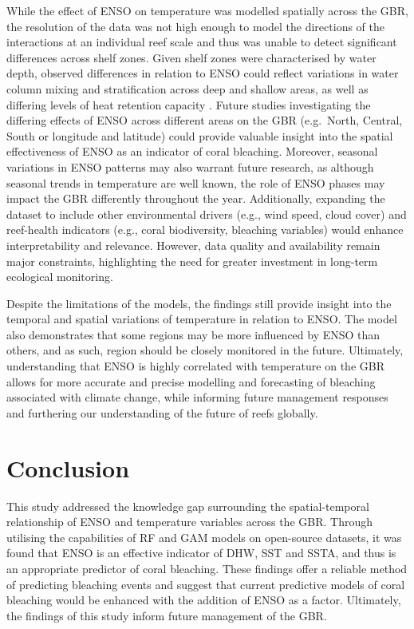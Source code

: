 \documentclass[letterpaper,9pt,twocolumn,twoside,]{pinp}
\begin{document}
While the effect of ENSO on temperature was modelled spatially across
the GBR, the resolution of the data was not high enough to model the
directions of the interactions at an individual reef scale and thus was
unable to detect significant differences across shelf zones. Given shelf
zones were characterised by water depth, observed differences in
relation to ENSO could reflect variations in water column mixing and
stratification across deep and shallow areas, as well as differing
levels of heat retention capacity \citet{DorrellLloyd2022}. Future
studies investigating the differing effects of ENSO across different
areas on the GBR (e.g.~North, Central, South or longitude and latitude)
could provide valuable insight into the spatial effectiveness of ENSO as
an indicator of coral bleaching. Moreover, seasonal variations in ENSO
patterns may also warrant future research, as although seasonal trends
in temperature are well known, the role of ENSO phases may impact the
GBR differently throughout the year. Additionally, expanding the dataset
to include other environmental drivers (e.g., wind speed, cloud cover)
and reef-health indicators (e.g., coral biodiversity, bleaching
variables) would enhance interpretability and relevance. However, data
quality and availability remain major constraints, highlighting the need
for greater investment in long-term ecological monitoring.

Despite the limitations of the models, the findings still provide
insight into the temporal and spatial variations of temperature in
relation to ENSO. The model also demonstrates that some regions may be
more influenced by ENSO than others, and as such, region should be
closely monitored in the future. Ultimately, understanding that ENSO is
highly correlated with temperature on the GBR allows for more accurate
and precise modelling and forecasting of bleaching associated with
climate change, while informing future management responses and
furthering our understanding of the future of reefs globally.

\section{Conclusion}\label{conclusion}

This study addressed the knowledge gap surrounding the spatial-temporal
relationship of ENSO and temperature variables across the GBR. Through
utilising the capabilities of RF and GAM models on open-source datasets,
it was found that ENSO is an effective indicator of DHW, SST and SSTA,
and thus is an appropriate predictor of coral bleaching. These findings
offer a reliable method of predicting bleaching events and suggest that
current predictive models of coral bleaching would be enhanced with the
addition of ENSO as a factor. Ultimately, the findings of this study
inform future management of the GBR.
\end{document}
